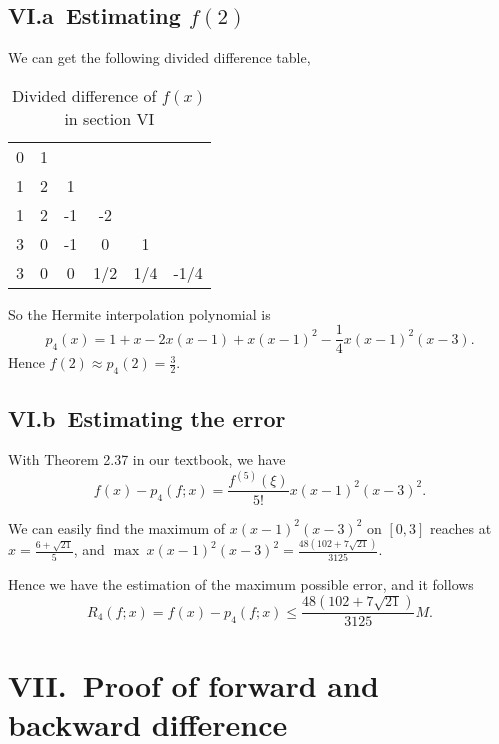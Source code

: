 \documentclass[a4paper]{article}
\renewcommand\arraystretch{1.8}
\begin{document}
\subsection*{VI.a\ Estimating $f(2)$}

We can get the following divided difference table,
\begin{table}[htbp]
  \centering
  \renewcommand{\arraystretch}{0.9}
  \begin{tabular}{c|ccccc}
    0 & 1 &    &     &   & \\
    1 & 2 & 1  &     &   & \\
    1 & 2 & -1 & -2  &   & \\
    3 & 0 & -1 &  0  & 1 & \\
    3 & 0 & 0  & 1/2 & 1/4 & -1/4 \\
  \end{tabular}
  \caption{Divided difference of $f(x)$ in section VI}
\end{table} 

So the Hermite interpolation polynomial is
\begin{equation}
  p_4(x) = 1 + x - 2x(x - 1) + x(x - 1)^2 - \frac{1}{4}x(x - 1)^2(x - 3).
  \label{eq:vi_p}
\end{equation}
Hence $f(2) \approx p_4(2) = \frac{3}{2}$.

\subsection*{VI.b\ Estimating the error}

With Theorem 2.37 in our textbook, we have 
\begin{equation}
  f(x) - p_4(f; x) = \frac{f^{(5)}(\xi)}{5!} x(x - 1)^2(x - 3)^2.
  \label{eq:vi_error}
\end{equation}

We can easily find the maximum of $x(x - 1)^2(x - 3)^2$ on $[0, 3]$ reaches at $x = \frac{6 + \sqrt{21}}{5}$, 
and $\max\ x(x - 1)^2(x - 3)^2 = \frac{48(102 + 7\sqrt{21})}{3125}$.

Hence we have the estimation of the maximum possible error, and it follows
\begin{equation}
  R_4(f; x) = f(x) - p_4(f; x) \leqslant \frac{48(102 + 7\sqrt{21})}{3125} M.
  \label{eq:vi_error_estimate}
\end{equation}

\section*{VII.\ Proof of forward and backward difference}
\end{document}
